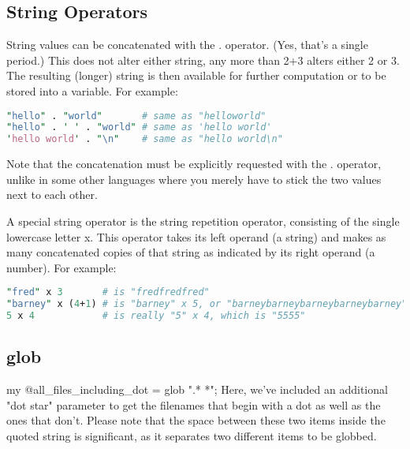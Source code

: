 \documentclass[a4paper,11pt]{book}
\begin{document}
\subsection{String Operators}
String values can be concatenated with the . operator. (Yes, that's a single 
period.) This does not alter either string, any more than 2+3 alters either 2
 or 3. The resulting (longer) string is then available for further computation
  or to be stored into a variable. For example: 
\begin{lstlisting}[language=perl]
"hello" . "world"       # same as "helloworld"
"hello" . ' ' . "world" # same as 'hello world'
'hello world' . "\n"    # same as "hello world\n"
\end{lstlisting}
Note that the concatenation must be explicitly requested with the . operator, 
unlike in some other languages where you merely have to stick the two values 
next to each other. 

A special string operator is the string repetition operator, consisting of 
the single lowercase letter x. This operator takes its left operand (a string) 
and makes as many concatenated copies of that string as indicated by its right
 operand (a number). For example: 
\begin{lstlisting}[language=perl]
"fred" x 3       # is "fredfredfred"
"barney" x (4+1) # is "barney" x 5, or "barneybarneybarneybarneybarney"
5 x 4            # is really "5" x 4, which is "5555"
\end{lstlisting}

\subsection{glob}
my @all_files_including_dot = glob ".* *";
Here, we've included an additional "dot star" parameter to get the filenames 
that begin with a dot as well as the ones that don't. Please note that the 
space between these two items inside the quoted string is significant, as it
 separates two different items to be globbed.
\end{document}
